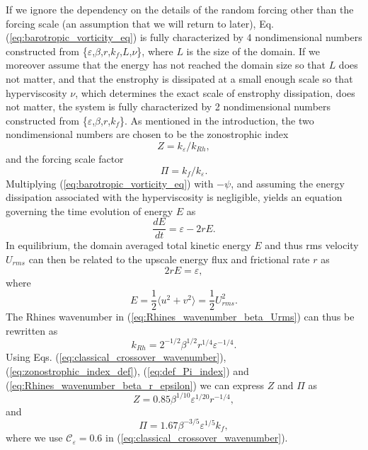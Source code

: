 \documentclass{jfm}
\begin{document}
If we ignore the dependency on the details of the random forcing other than the forcing scale 
(an assumption that we will return to later), Eq. (\ref{eq:barotropic_vorticity_eq})
is fully characterized by 4 nondimensional
numbers constructed from \{$\varepsilon$,$\beta$,$r$,$k_{f}$,$L$,$\nu$\},
where $L$ is the size of the domain. If we moreover assume that the energy has
not reached the domain size so that $L$ does not matter, and that the
enstrophy is dissipated at a small enough scale so that hyperviscosity
$\nu$, which determines the exact scale of enstrophy dissipation,
does not matter, the system is fully characterized
by 2 nondimensional numbers constructed from \{$\varepsilon$,$\beta$,$r$,$k_{f}$\}.
As mentioned in the introduction, the two nondimensional numbers
are chosen to be the zonostrophic index 
\[
Z=k_{\varepsilon}/k_{Rh},
\]
and the forcing scale factor
\[
\Pi=k_{f}/k_{\varepsilon}.
\]
Multiplying (\ref{eq:barotropic_vorticity_eq}) with $-\psi$, and assuming the energy dissipation
associated with the hyperviscosity is negligible, yields
an equation governing the time evolution of energy $E$ as
\begin{equation}
\frac{dE}{dt}=\varepsilon-2rE.\label{eq:energy_evolution_equation}
\end{equation}
In equilibrium, the domain averaged total kinetic energy $E$ and
thus rms velocity $U_{rms}$ can then be related to the upscale energy flux
and frictional rate $r$ as
\[
2rE=\varepsilon,
\]
where 
\[
E=\frac{1}{2}\langle u^{2}+v^{2}\rangle=\frac{1}{2}U_{rms}^{2}.
\]
The Rhines wavenumber in (\ref{eq:Rhines_wavenumber_beta_Urms}) can thus
be rewritten as
\begin{equation}
k_{Rh}=2^{-1/2}\beta^{1/2}r^{1/4}\varepsilon^{-1/4}.\label{eq:Rhines_wavenumber_beta_r_epsilon}
\end{equation}
Using Eqs. (\ref{eq:classical_crossover_wavenumber}), (\ref{eq:zonostrophic_index_def}), 
(\ref{eq:def_Pi_index}) and (\ref{eq:Rhines_wavenumber_beta_r_epsilon}) we can express $Z$ and $\Pi$ as
\begin{equation}
Z=0.85\beta^{1/10}\varepsilon^{1/20}r^{-1/4},\label{eq:Z_estimate_in_work}
\end{equation}
and
\begin{equation}
\Pi=1.67\beta^{-3/5}\varepsilon^{1/5}k_{f},\label{eq:PI_estimate_in_work}
\end{equation}
where we use $\mathcal{\mathcal{C}_{\varepsilon}}=0.6$ in (\ref{eq:classical_crossover_wavenumber}).
\end{document}
